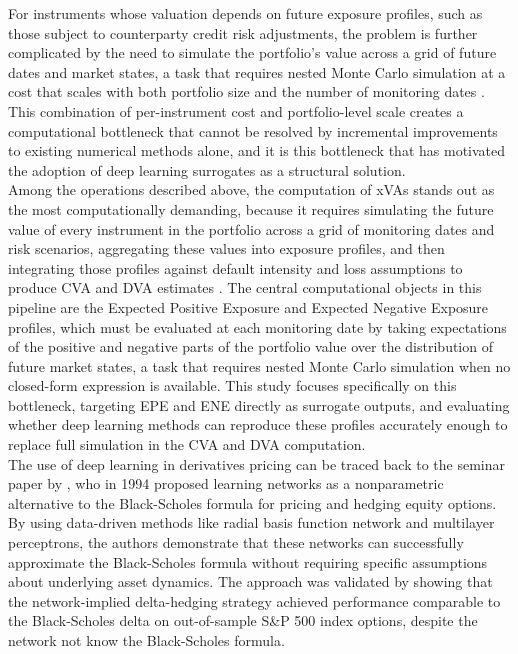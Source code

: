     \noindent
    For instruments whose valuation depends on future exposure profiles, such as those subject to counterparty credit risk adjustments, the problem is further complicated by the need to simulate the portfolio's value across a grid of future dates and market states, a task that requires nested Monte Carlo simulation at a cost that scales with both portfolio size and the number of monitoring dates \cite{dhandapani2024optimizing}. This combination of per-instrument cost and portfolio-level scale creates a computational bottleneck that cannot be resolved by incremental improvements to existing numerical methods alone, and it is this bottleneck that has motivated the adoption of deep learning surrogates as a structural solution.\\

    \noindent
    Among the operations described above, the computation of xVAs stands out as the most computationally demanding, because it requires simulating the future value of every instrument in the portfolio across a grid of monitoring dates and risk scenarios, aggregating these values into exposure profiles, and then integrating those profiles against default intensity and loss assumptions to produce CVA and DVA estimates \cite{andersson2021deeplearning, goudenege2025xva}. The central computational objects in this pipeline are the Expected Positive Exposure and Expected Negative Exposure profiles, which must be evaluated at each monitoring date by taking expectations of the positive and negative parts of the portfolio value over the distribution of future market states, a task that requires nested Monte Carlo simulation when no closed-form expression is available. This study focuses specifically on this bottleneck, targeting EPE and ENE directly as surrogate outputs, and evaluating whether deep learning methods can reproduce these profiles accurately enough to replace full simulation in the CVA and DVA computation. \\

    \noindent
    The use of deep learning in derivatives pricing can be traced back to the seminar paper by \cite{hutchinson1994nonparametric}, who in 1994 proposed learning networks as a nonparametric alternative to the Black-Scholes formula for pricing and hedging equity options. By using data-driven methods like radial basis function network and multilayer perceptrons, the authors demonstrate that these networks can successfully approximate the Black-Scholes formula without requiring specific assumptions about underlying asset dynamics. The approach was validated by showing that the network-implied delta-hedging strategy achieved performance comparable to the Black-Scholes delta on out-of-sample S\&P 500 index options, despite the network not know the Black-Scholes formula. \\
    
